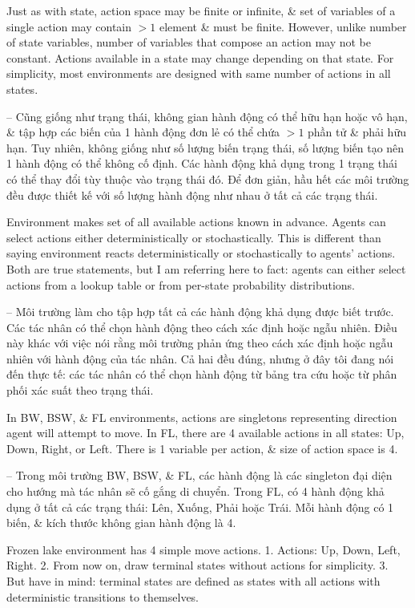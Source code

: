 \documentclass{article}
\begin{document}
\begin{itemize}
\begin{itemize}
        Just as with state, action space may be finite or infinite, \& set of variables of a single action may contain $> 1$ element \& must be finite. However, unlike number of state variables, number of variables that compose an action may not be constant. Actions available in a state may change depending on that state. For simplicity, most environments are designed with same number of actions in all states.

        -- Cũng giống như trạng thái, không gian hành động có thể hữu hạn hoặc vô hạn, \& tập hợp các biến của 1 hành động đơn lẻ có thể chứa $> 1$ phần tử \& phải hữu hạn. Tuy nhiên, không giống như số lượng biến trạng thái, số lượng biến tạo nên 1 hành động có thể không cố định. Các hành động khả dụng trong 1 trạng thái có thể thay đổi tùy thuộc vào trạng thái đó. Để đơn giản, hầu hết các môi trường đều được thiết kế với số lượng hành động như nhau ở tất cả các trạng thái.

        Environment makes set of all available actions known in advance. Agents can select actions either deterministically or stochastically. This is different than saying environment reacts deterministically or stochastically to agents' actions. Both are true statements, but I am referring here to fact: agents can either select actions from a lookup table or from per-state probability distributions.

        -- Môi trường làm cho tập hợp tất cả các hành động khả dụng được biết trước. Các tác nhân có thể chọn hành động theo cách xác định hoặc ngẫu nhiên. Điều này khác với việc nói rằng môi trường phản ứng theo cách xác định hoặc ngẫu nhiên với hành động của tác nhân. Cả hai đều đúng, nhưng ở đây tôi đang nói đến thực tế: các tác nhân có thể chọn hành động từ bảng tra cứu hoặc từ phân phối xác suất theo trạng thái.

        In BW, BSW, \& FL environments, actions are singletons representing direction agent will attempt to move. In FL, there are 4 available actions in all states: Up, Down, Right, or Left. There is 1 variable per action, \& size of action space is 4.

        -- Trong môi trường BW, BSW, \& FL, các hành động là các singleton đại diện cho hướng mà tác nhân sẽ cố gắng di chuyển. Trong FL, có 4 hành động khả dụng ở tất cả các trạng thái: Lên, Xuống, Phải hoặc Trái. Mỗi hành động có 1 biến, \& kích thước không gian hành động là 4.

        {\sf Frozen lake environment has 4 simple move actions.} 1. Actions: Up, Down, Left, Right. 2. From now on, draw terminal states without actions for simplicity. 3. But have in mind: terminal states are defined as states with all actions with deterministic transitions to themselves.


\end{itemize}
\end{itemize}
\end{document}
